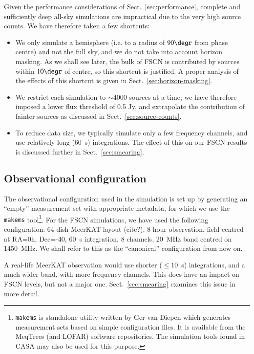 \documentclass{aa}
\begin{document}
Given the performance considerations of Sect.~\ref{sec:performance}, complete and sufficiently deep all-sky simulations are impractical due to the very high source counts. We have therefore taken a few shortcuts:

\begin{itemize}
  \item We only simulate a hemisphere (i.e. to a radius of $90\degr$ from phase centre) and not the full sky, and we do not take into account horizon masking. As we shall see later, the bulk of FSCN is contributed by sources within $10\degr$ of centre, so this shortcut is justified. A proper analysis of the effects of this shortcut is given in Sect.~\ref{sec:horizon-masking}.
  \item We restrict each simulation to $\sim4000$ sources at a time; we have therefore imposed a lower flux threshold of 0.5 Jy, and extrapolate the contribution of fainter sources as discussed in Sect.~\ref{sec:source-counts}.
  \item To reduce data size, we typically simulate only a few frequency channels, and use relatively long (60~s) integrations. The effect of this on our FSCN results is discussed further in Sect.~\ref{sec:smearing}.
\end{itemize}

\subsection{Observational configuration}
\label{sec:config}

The observational configuration used in the simulation is set up by generating an ``empty'' measurement set with appropriate metadata, for which we use the {\tt makems} tool\footnote{{\tt makems} is standalone utility written by Ger van Diepen which generates measurement sets based on simple configuration files. It is available from the MeqTrees (and LOFAR) software repositories. The simulation tools found in CASA may also be used for this purpose.}. For the FSCN simulations, we have used the following configuration: 64-dish MeerKAT layout (cite?), 8 hour observation, field centred at RA=0h, Dec=-40\degr, 60~s integration, 8 channels, 20~MHz band centred on 1450~MHz. We shall refer to this as the ``canonical'' configuration from now on.

A real-life MeerKAT observation would use shorter ($\leq10$~s) integrations, and a much wider band, with more frequency channels. This does have an impact on FSCN levels, but not a major one. Sect.~\ref{sec:smearing} examines this issue in more detail.
\end{document}
